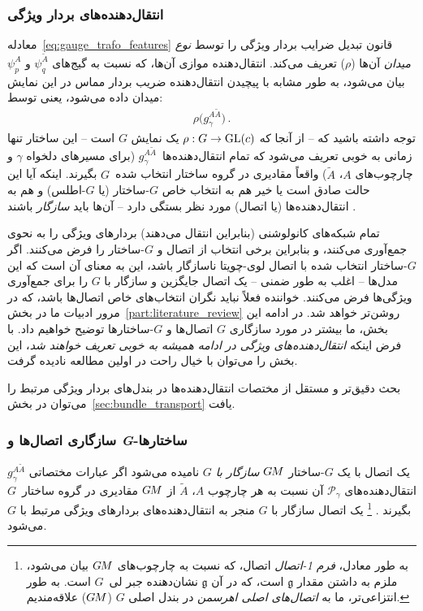 \subsubsection{انتقال‌دهنده‌های بردار ویژگی}

معادله~\eqref{eq:gauge_trafo_features} قانون تبدیل ضرایب بردار ویژگی را توسط \emph{نوع میدان} آن‌ها ($\rho$) تعریف می‌کند.
انتقال‌دهنده موازی آن‌ها، که نسبت به گیج‌های $\psi_q^{\widetilde{A}}$ و $\psi_p^A$ بیان می‌شود، به طور مشابه با پیچیدن انتقال‌دهنده ضریب بردار مماس در این نمایش میدان داده می‌شود، یعنی توسط:
\begin{align}
    \rho\big( g_\gamma^{A\widetilde{A}} \big) \,.
\end{align}
توجه داشته باشید که -- از آنجا که $\rho:G\to\operatorname{GL}(c)$ یک نمایش $G$ است -- این ساختار تنها زمانی به خوبی تعریف می‌شود که تمام انتقال‌دهنده‌ها~$g_\gamma^{A\widetilde{A}}$ (برای مسیرهای دلخواه $\gamma$ و چارچوب‌های $A$، $\widetilde{A}$) واقعاً مقادیری در گروه ساختار انتخاب شده~$G$ بگیرند.
اینکه آیا این حالت صادق است یا خیر هم به انتخاب خاص $G$-ساختار (یا $G$-اطلس) و هم به انتقال‌دهنده‌ها (یا اتصال) مورد نظر بستگی دارد -- آن‌ها باید \emph{سازگار} باشند \cite{wendlLectureNotesBundles2008}.


تمام شبکه‌های کانولوشنی (بنابراین انتقال می‌دهند) بردارهای ویژگی را به نحوی جمع‌آوری می‌کنند، و بنابراین برخی انتخاب از اتصال و $G$-ساختار را فرض می‌کنند.
اگر $G$-ساختار انتخاب شده با اتصال لوی-چویتا ناسازگار باشد، این به معنای آن است که این مدل‌ها -- اغلب به طور ضمنی -- یک اتصال جایگزین و سازگار با $G$ را برای جمع‌آوری ویژگی‌ها فرض می‌کنند.
خواننده فعلاً نباید نگران انتخاب‌های خاص اتصال‌ها باشد، که در مرور ادبیات ما در بخش~\ref{part:literature_review} روشن‌تر خواهد شد.
در ادامه این بخش، ما بیشتر در مورد سازگاری $G$ اتصال‌ها و $G$-ساختارها توضیح خواهیم داد.
با فرض اینکه \emph{انتقال‌دهنده‌های ویژگی در ادامه همیشه به خوبی تعریف خواهند شد}، این بخش را می‌توان با خیال راحت در اولین مطالعه نادیده گرفت.

بحث دقیق‌تر و مستقل از مختصات انتقال‌دهنده‌ها در بندل‌های بردار ویژگی مرتبط را می‌توان در بخش~\ref{sec:bundle_transport} یافت.


\subsubsection{سازگاری اتصال‌ها و \textit{G}-ساختارها}

یک اتصال با یک $G$-ساختار $G\mkern-1.4muM$ \emph{سازگار با $G$} نامیده می‌شود اگر عبارات مختصاتی $g_\gamma^{A\widetilde{A}}$ انتقال‌دهنده‌های $\mathcal{P}_\gamma$ آن نسبت به هر چارچوب $A$، $\widetilde{A}$ از $G\mkern-1.4muM$ مقادیری در گروه ساختار~$G$ بگیرند \cite{wendlLectureNotesBundles2008}.%
\footnote{
    به طور معادل، \emph{فرم 1-اتصال} اتصال، که نسبت به چارچوب‌های $G\mkern-1.4muM$ بیان می‌شود، ملزم به داشتن مقدار $\mathfrak{g}$ است، که در آن $\mathfrak{g}$ نشان‌دهنده جبر لی~$G$ است.
    به طور انتزاعی‌تر، ما به \emph{اتصال‌های اصلی اهرسمن} در بندل اصلی $G$ ($G\mkern-1.4muM$) علاقه‌مندیم.
}
یک اتصال سازگار با $G$ منجر به انتقال‌دهنده‌های بردارهای ویژگی مرتبط با $G$ می‌شود.

